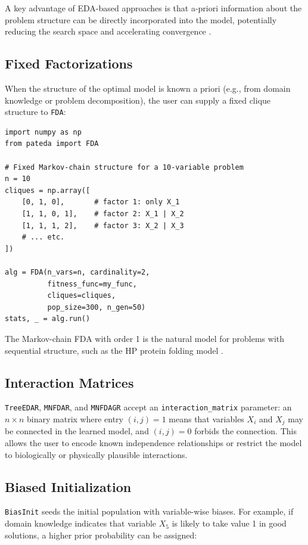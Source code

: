 \documentclass[a4paper,11pt]{article}
\begin{document}
A key advantage of EDA-based approaches is that a-priori information about
the problem structure can be directly incorporated into the model, potentially
reducing the search space and accelerating convergence
\citep{Santana_et_al:2009b}.

\subsection{Fixed Factorizations}

When the structure of the optimal model is known a priori (e.g., from domain
knowledge or problem decomposition), the user can supply a fixed clique
structure to \texttt{FDA}:

\begin{lstlisting}
import numpy as np
from pateda import FDA

# Fixed Markov-chain structure for a 10-variable problem
n = 10
cliques = np.array([
    [0, 1, 0],       # factor 1: only X_1
    [1, 1, 0, 1],    # factor 2: X_1 | X_2
    [1, 1, 1, 2],    # factor 3: X_2 | X_3
    # ... etc.
])

alg = FDA(n_vars=n, cardinality=2,
          fitness_func=my_func,
          cliques=cliques,
          pop_size=300, n_gen=50)
stats, _ = alg.run()
\end{lstlisting}

The Markov-chain FDA with order 1 is the natural model for problems with
sequential structure, such as the HP protein folding model
\citep{Dill:1985,Santana_et_al:2004}.

\subsection{Interaction Matrices}

\texttt{TreeEDAR}, \texttt{MNFDAR}, and \texttt{MNFDAGR} accept an
\texttt{interaction\_matrix} parameter: an $n \times n$ binary matrix where
entry $(i,j)=1$ means that variables $X_i$ and $X_j$ may be connected in
the learned model, and $(i,j)=0$ forbids the connection.  This allows the
user to encode known independence relationships or restrict the model to
biologically or physically plausible interactions.

\subsection{Biased Initialization}

\texttt{BiasInit} seeds the initial population with variable-wise biases.
For example, if domain knowledge indicates that variable $X_5$ is likely to
take value 1 in good solutions, a higher prior probability can be assigned:
\end{document}
